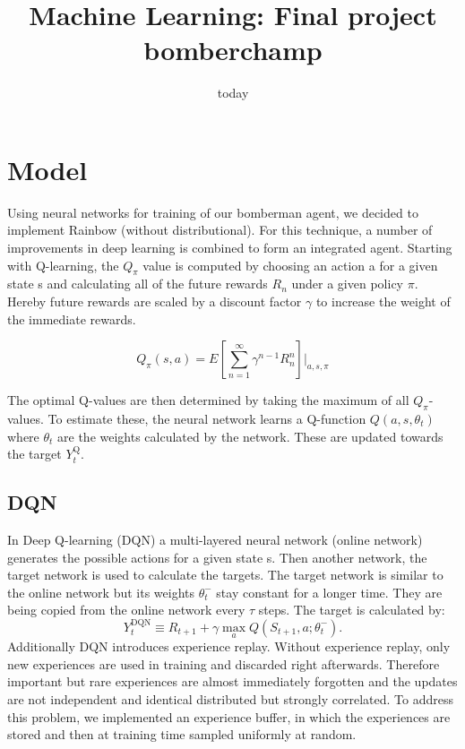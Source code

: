 \documentclass[12pt]{article}
\title{Machine Learning: Final project bomberchamp}
\date{today}
\begin{document}
\section{Model}
Using neural networks for training of our bomberman agent, we decided to implement Rainbow (without distributional). For this technique, a number of improvements in deep learning is combined to form an integrated agent. Starting with Q-learning, the $Q_\pi$ value is computed by choosing an action a for a given state s and calculating all of the future rewards $R_n$ under a given policy $\pi$.
Hereby future rewards are scaled by a discount factor $\gamma$ to increase the weight of the immediate rewards.

\begin{equation}
Q_\pi(s,a)= E\left[\sum_{n=1}^{\infty} \gamma^{n-1}R_n^n\right] \Bigg|_{a,s,\pi}
\end{equation}

The optimal Q-values are then determined by taking the maximum of all $Q_\pi$-values.
To estimate these, the neural network learns a Q-function $Q(a, s, \theta_t)$ where $\theta_t$ are the weights calculated by the network.
These are updated towards the target $Y_{t}^{\mathrm{Q}}$.
\subsection{DQN}
In Deep Q-learning (DQN) a multi-layered neural network (online network) generates the possible actions for a given state s. Then another network, the target network is used to calculate the targets.
The target network is similar to the online network but its weights $\theta_t^-$ stay constant for a longer time. They are being copied from the online network every $\tau$ steps.
The target is calculated by:
\begin{equation}
Y_{t}^{\mathrm{DQN}} \equiv R_{t+1}+\gamma \max _{a} Q\left(S_{t+1}, a ; \theta_{t}^{-}\right).
\end{equation}
Additionally DQN introduces experience replay. Without experience replay, only new experiences are used in training and discarded right afterwards.
Therefore important but rare experiences are almost immediately forgotten and the updates are not independent and identical distributed but strongly correlated.
To address this problem, we implemented an experience buffer, in which the experiences are stored and then at training time sampled uniformly at random.
\end{document}
